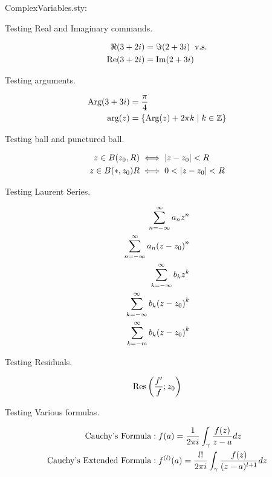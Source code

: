 \documentclass[12pt]{report}
\begin{document}
ComplexVariables.sty:
	
Testing Real and Imaginary commands.

\begin{align*}
	\Re(3+2i) &= \Im(2+3i) \;\;\text{v.s.}\\
	\Real(3+2i) &= \Imaginary(2+3i) \\
\end{align*}

Testing arguments.

\begin{align*}
	\Arg(3+3i) &= \frac{\pi}{4} \\
	\arg(z) &= \{\Arg(z) + 2\pi k \mid k \in \mathbb{Z} \}
\end{align*}	
	
Testing ball and punctured ball.

\begin{align*}
	z \in \Ball{z_0}{R} & \iff \left| z - z_0 \right| < R \\
	z \in \Ball*{z_0}{R} &\iff 0 < \left| z - z_0 \right| < R 
\end{align*}

	
Testing Laurent Series.
	
\begin{align*}
\LaurentSeriesBasic \\
\LaurentSeriesVar{(z-z_0)} \\
\LaurentSeriesCoef{b}{k} \\
\LaurentSeries{(z-z_0)}{b}{k} \\
\LaurentSeriesIndexed{(z-z_0)}{b}{k}{-m}
\end{align*} 

Testing Residuals.

\begin{align*}
	\Residual{\frac{f'}{f}}{z_0}
\end{align*}

Testing Various formulas.

\begin{align*}
	\text{Cauchy's Formula}:&\;\CauchyFormula \\
	\text{Cauchy's Extended Formula}:&\;\CauchyFormulaExtended \\
\end{align*}
\end{document}
